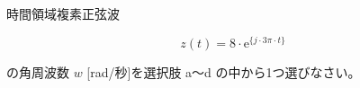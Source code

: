 時間領域複素正弦波

\[
z(t) = 8 \cdot \textrm{e}^{\{ j \cdot 3\pi \cdot t \}}
\]

\bigskip
\noindent の角周波数 $w$ [rad/秒]を選択肢 a〜d の中から1つ選びなさい。
